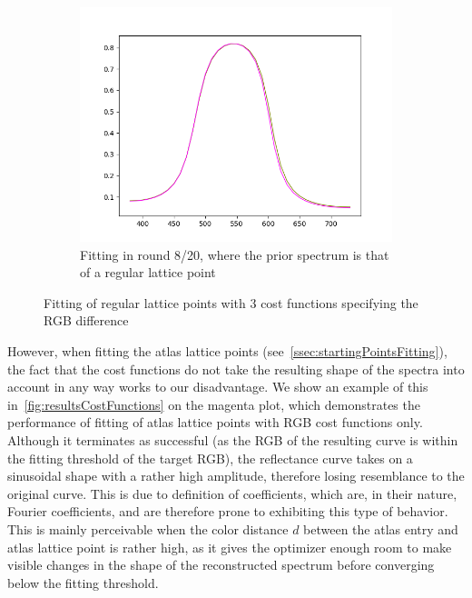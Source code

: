 \begin{figure}[t]
\begin{subfigure}[t]{0.45\textwidth}
	\label{fig:costFunctionsRegularRound2}
	\end{subfigure} \hspace{0.1em}
	\begin{subfigure}[t]{0.45\textwidth}
		\includegraphics[width=\linewidth,height=0.2\textheight]{img/cost_functions_regular_round8.png}
		\caption{Fitting in round 8/20, where the prior spectrum is that of a regular lattice point}
		\label{fig:costFunctionsRegularRound8}
	\end{subfigure} 
	\caption{Fitting of regular lattice points with 3 cost functions specifying the RGB difference}
	\label{fig:costFunctionsRegularFitting}
\end{figure}

However, when fitting the atlas lattice points (see~\cref{ssec:startingPointsFitting}), the fact that the cost functions do not take the resulting shape of the spectra into account in any way works to our disadvantage. We show an example of this in~\cref{fig:resultsCostFunctions} on the magenta plot, which demonstrates the performance of fitting of atlas lattice points with RGB cost functions only. Although it terminates as successful (as the RGB of the resulting curve is within the fitting threshold of the target RGB), the reflectance curve takes on a sinusoidal shape with a rather high amplitude, therefore losing resemblance to the original curve. This is due to definition of coefficients, which are, in their nature, Fourier coefficients, and are therefore prone to exhibiting this type of behavior. This is mainly perceivable when the color distance $d$ between the atlas entry and atlas lattice point is rather high, as it gives the optimizer enough room to make visible changes in the shape of the reconstructed spectrum before converging below the fitting threshold.
 
